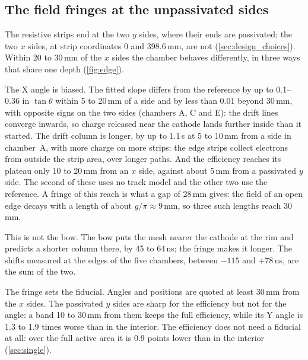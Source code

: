 \subsection{The field fringes at the unpassivated sides}\label{sec:edge}
The resistive strips end at the two $y$ sides, where their ends are passivated; the two $x$ sides, at strip
coordinates 0 and 398.6\,mm, are not (\cref{sec:design_choices}). Within 20 to 30\,mm of the $x$ sides the chamber
behaves differently, in three ways that share one depth (\cref{fig:edge}).

The X angle is biased. The fitted slope differs from the reference by up to 0.1--0.36 in $\tan\theta$ within 5 to
20\,mm of a side and by less than 0.01 beyond 30\,mm, with opposite signs on the two sides (chambers A, C and E): the
drift lines converge
inwards, so charge released near the cathode lands further inside than it started. The drift column is longer, by up
to 1.1\,\textmu s at 5 to 10\,mm from a side in chamber~A, with more charge on more strips: the edge strips collect
electrons from outside the strip area, over longer paths. And the efficiency reaches its plateau only 10 to 20\,mm
from an $x$ side, against about 5\,mm from a passivated $y$ side. The second of these uses no track model and the
other two use the reference. A fringe of this reach is what a gap of 28\,mm gives: the field of an open edge decays
with a length of about $g/\pi\approx9$\,mm, so three such lengths reach 30\,mm.

This is not the bow. The bow puts the mesh nearer the cathode at the rim and predicts a shorter column there, by 45
to 64\,ns; the fringe makes it longer. The shifts measured at the edges of the five chambers, between $-115$ and
$+78$\,ns, are the sum of the two.

The fringe sets the fiducial. Angles and positions are quoted at least 30\,mm from the $x$ sides. The passivated $y$
sides are sharp for the efficiency but not for the angle: a band 10 to 30\,mm from them keeps the full efficiency,
while its Y angle is 1.3 to 1.9 times worse than in the interior. The efficiency does not need a fiducial at all: over
the full active area it is 0.9 points lower than in the interior (\cref{sec:single}).

